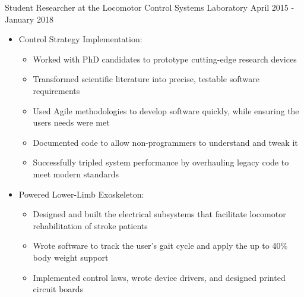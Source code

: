 Student Researcher at the Locomotor Control Systems Laboratory
\hfill
April 2015 - January 2018
\begin{itemize}
    \item Control Strategy Implementation:
    \begin{itemize}
        \item Worked with PhD candidates to prototype cutting-edge research devices
        \item Transformed scientific literature into precise, testable software requirements
        \item Used Agile methodologies to develop software quickly, while ensuring the user\textsc{}s needs were met
        \item Documented code to allow non-programmers to understand and tweak it
        \item Successfully tripled system performance by overhauling legacy code to meet modern standards
    \end{itemize}
    \item Powered Lower-Limb Exoskeleton:
    \begin{itemize}
        \item Designed and built the electrical subsystems that facilitate locomotor rehabilitation of stroke patients %
        \item Wrote software to track the user’s gait cycle and apply the up to 40\% body weight support
        \item Implemented control laws, wrote device drivers, and designed printed circuit boards
    \end{itemize}
\end{itemize}
